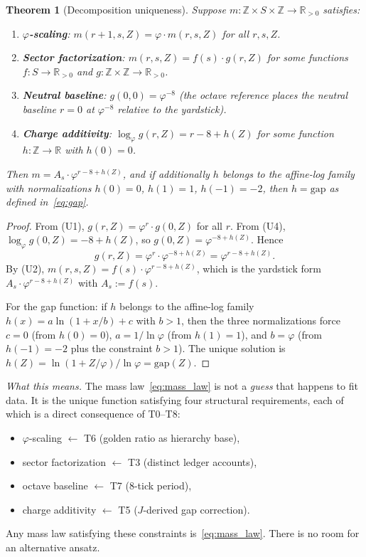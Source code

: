 \documentclass[11pt,a4paper]{article}
\newtheorem{theorem}{Theorem}[section]
\theoremstyle{definition}
\theoremstyle{remark}
\newcommand{\phig}{\varphi}
\newcommand{\Jcost}{J}
\begin{document}
\begin{theorem}[Decomposition uniqueness]
\label{thm:decomposition_unique}
Suppose $m : \mathbb{Z} \times S \times \mathbb{Z} \to \mathbb{R}_{>0}$
satisfies:
\begin{enumerate}[nosep,label=(U\arabic*)]
  \item \textbf{$\phig$-scaling}: $m(r+1, s, Z) = \phig \cdot m(r, s, Z)$
        for all $r, s, Z$.
  \item \textbf{Sector factorization}: $m(r, s, Z) = f(s) \cdot g(r, Z)$ for
        some functions $f : S \to \mathbb{R}_{>0}$ and
        $g : \mathbb{Z} \times \mathbb{Z} \to \mathbb{R}_{>0}$.
  \item \textbf{Neutral baseline}: $g(0, 0) = \phig^{-8}$ (the octave
        reference places the neutral baseline $r = 0$ at $\phig^{-8}$
        relative to the yardstick).
  \item \textbf{Charge additivity}: $\log_\phig g(r, Z) = r - 8 + h(Z)$ for
        some function $h : \mathbb{Z} \to \mathbb{R}$ with $h(0) = 0$.
\end{enumerate}
Then $m = A_s \cdot \phig^{r - 8 + h(Z)}$, and if additionally $h$ belongs
to the affine-log family with normalizations $h(0) = 0$, $h(1) = 1$,
$h(-1) = -2$, then $h = \mathrm{gap}$ as defined in~\eqref{eq:gap}.
\end{theorem}

\begin{proof}
From (U1), $g(r, Z) = \phig^r \cdot g(0, Z)$ for all $r$.
From (U4), $\log_\phig g(0, Z) = -8 + h(Z)$, so
$g(0, Z) = \phig^{-8 + h(Z)}$.  Hence
\[
  g(r, Z) = \phig^r \cdot \phig^{-8 + h(Z)} = \phig^{r - 8 + h(Z)}.
\]
By (U2), $m(r, s, Z) = f(s) \cdot \phig^{r - 8 + h(Z)}$, which is the
yardstick form $A_s \cdot \phig^{r - 8 + h(Z)}$ with $A_s := f(s)$.

For the gap function: if $h$ belongs to the affine-log family
$h(x) = a\ln(1 + x/b) + c$ with $b > 1$, then the three normalizations
force $c = 0$ (from $h(0) = 0$), $a = 1/\ln\phig$ (from $h(1) = 1$), and
$b = \phig$ (from $h(-1) = -2$ plus the constraint $b > 1$).  The unique
solution is $h(Z) = \ln(1 + Z/\phig)/\ln\phig = \mathrm{gap}(Z)$.
\end{proof}

\noindent\textit{What this means.}\quad
The mass law~\eqref{eq:mass_law} is not a \emph{guess} that happens to fit
data.  It is the unique function satisfying four structural requirements,
each of which is a direct consequence of T0--T8:
\begin{itemize}[nosep]
  \item $\phig$-scaling $\leftarrow$ T6 (golden ratio as hierarchy base),
  \item sector factorization $\leftarrow$ T3 (distinct ledger accounts),
  \item octave baseline $\leftarrow$ T7 (8-tick period),
  \item charge additivity $\leftarrow$ T5 ($\Jcost$-derived gap correction).
\end{itemize}
Any mass law satisfying these constraints is~\eqref{eq:mass_law}.  There is
no room for an alternative ansatz.
\end{document}
